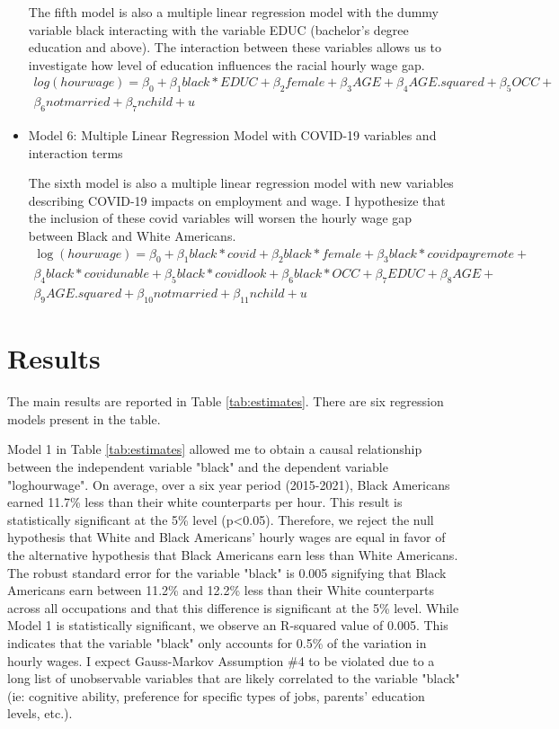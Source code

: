 \documentclass[12pt, english]{article}
\begin{document}
\begin{itemize}
        The fifth model is also a multiple linear regression model with the dummy variable black interacting with the variable EDUC (bachelor’s degree education and above). The interaction between these variables allows us to investigate how level of education influences the racial hourly wage gap.
        \begin{multline*}
            log(hourwage) = \beta_0 + \beta_1black*EDUC + \beta_2female + \beta_3AGE + \beta_4AGE.squared + \beta_5OCC +\\ \beta_6notmarried + \beta_7nchild + u
        \end{multline*}
        \item Model 6: Multiple Linear Regression Model with COVID-19 variables and interaction terms

        The sixth model is also a multiple linear regression model with new variables describing COVID-19 impacts on employment and wage. I hypothesize that the inclusion of these covid variables will worsen the hourly wage gap between Black and White Americans.
        \begin{multline*}
            \log(hourwage) = \beta_0 + \beta_1black*covid + \beta_2black*female + \beta_3black*covidpayremote +\\ \beta_4black*covidunable + \beta_5black*covidlook + \beta_6black*OCC + \beta_7EDUC + \beta_8AGE +\\ \beta_9AGE.squared + \beta_10notmarried + \beta_11nchild + u
        \end{multline*}


    \end{itemize}
\section{Results}
The main results are reported in Table \ref{tab:estimates}. There are six regression models present in the table. 

Model 1 in Table \ref{tab:estimates} allowed me to obtain a causal relationship between the independent variable "black" and the dependent variable "loghourwage". On average, over a six year period (2015-2021), Black Americans earned 11.7\% less than their white counterparts per hour. This result is statistically significant at the 5\% level (p\textless0.05). Therefore, we reject the null hypothesis that White and Black Americans' hourly wages are equal in favor of the alternative hypothesis that Black Americans earn less than White Americans. The robust standard error for the variable "black" is 0.005 signifying that Black Americans earn between 11.2\% and 12.2\% less than their White counterparts across all occupations and that this difference is significant at the 5\% level. While Model 1 is statistically significant, we observe an R-squared value of 0.005. This indicates that the variable "black" only accounts for 0.5\% of the variation in hourly wages. I expect Gauss-Markov Assumption \#4 to be violated due to a long list of unobservable variables that are likely correlated to the variable "black" (ie: cognitive ability, preference for specific types of jobs, parents' education levels, etc.).
\end{document}
